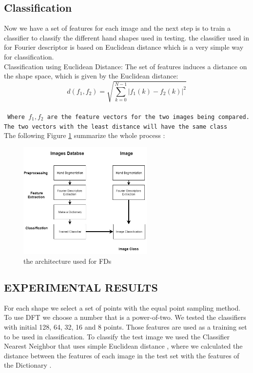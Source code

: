 \subsection{Classification }
Now we have a set of features for each image and the next
step is to train a classifier to classify the different hand shapes
used in testing. the classifier used in for Fourier descriptor is based on Euclidean distance which is a very simple way for
classification.\\
Classification using Euclidean Distance: The set of
features induces a distance on the shape space, which is given
by the Euclidean distance: 
$$d(f_{1},f_{2}) = \sqrt{\sum_{k=0}^{N-1} |f_{1}(k)-f_{2}(k)|^{2}}$$\\
\texttt{ Where $f_{1},f_{2}$ are the feature vectors for the two images being
compared. The two vectors with the least distance will have
the same class}\\



 The following Figure \ref{fig:dft} summarize the whole process :  
        
\begin{figure}[H]
\centering
\includegraphics[width=0.6\textwidth]{img/latex.jpg}
\caption{the architecture used for FDs}
\label{fig:dft}
\end{figure}


\subsection{EXPERIMENTAL RESULTS}

For each shape we select a set of points with the equal point
sampling method. To use DFT we choose a number that is a
power-of-two. We tested the classifiers with initial 128, 64, 32, 16
and 8 points. Those features are used as a training set to be
used in classification. To classify the test image we used the Classifier Nearest Neighbor that uses simple  Euclidean distance , where we calculated the distance between the features of each image in
the test set with the features of the Dictionary .

